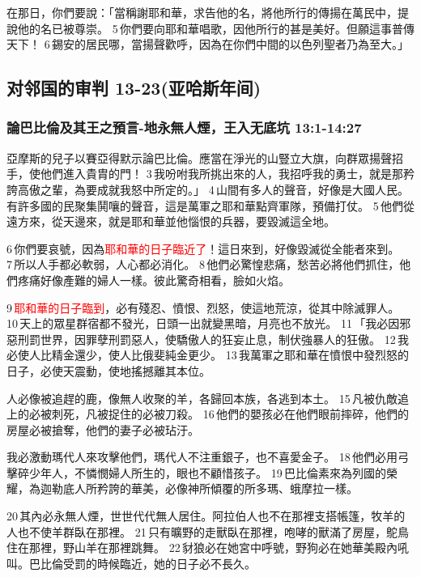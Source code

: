 在那日，你們要說：「當稱謝耶和華，求告他的名，將他所行的傳揚在萬民中，提說他的名已被尊崇。 5 你們要向耶和華唱歌，因他所行的甚是美好。但願這事普傳天下！ 6 錫安的居民哪，當揚聲歡呼，因為在你們中間的以色列聖者乃為至大。」

\subsection{对邻国的审判 13-23(亚哈斯年间)}
\subsubsection{論巴比倫及其王之預言-地永無人煙，王入无底坑 13:1-14:27}
亞摩斯的兒子以賽亞得默示論巴比倫。應當在淨光的山豎立大旗，向群眾揚聲招手，使他們進入貴胄的門！ 3 我吩咐我所挑出來的人，我招呼我的勇士，就是那矜誇高傲之輩，為要成就我怒中所定的。」 4 山間有多人的聲音，好像是大國人民。有許多國的民聚集鬨嚷的聲音，這是萬軍之耶和華點齊軍隊，預備打仗。 5 他們從遠方來，從天邊來，就是耶和華並他惱恨的兵器，要毀滅這全地。



6 你們要哀號，因為\textcolor{red}{耶和華的日子臨近了}！這日來到，好像毀滅從全能者來到。 7 所以人手都必軟弱，人心都必消化。 8 他們必驚惶悲痛，愁苦必將他們抓住，他們疼痛好像產難的婦人一樣。彼此驚奇相看，臉如火焰。 

9 \textcolor{red}{耶和華的日子臨到}，必有殘忍、憤恨、烈怒，使這地荒涼，從其中除滅罪人。 10 天上的眾星群宿都不發光，日頭一出就變黑暗，月亮也不放光。 11 「我必因邪惡刑罰世界，因罪孽刑罰惡人，使驕傲人的狂妄止息，制伏強暴人的狂傲。 12 我必使人比精金還少，使人比俄斐純金更少。 13 我萬軍之耶和華在憤恨中發烈怒的日子，必使天震動，使地搖撼離其本位。



人必像被追趕的鹿，像無人收聚的羊，各歸回本族，各逃到本土。 15 凡被仇敵追上的必被刺死，凡被捉住的必被刀殺。 16 他們的嬰孩必在他們眼前摔碎，他們的房屋必被搶奪，他們的妻子必被玷汙。

我必激動瑪代人來攻擊他們，瑪代人不注重銀子，也不喜愛金子。 18 他們必用弓擊碎少年人，不憐憫婦人所生的，眼也不顧惜孩子。 19 巴比倫素來為列國的榮耀，為迦勒底人所矜誇的華美，必像神所傾覆的所多瑪、蛾摩拉一樣。 

20 其內必永無人煙，世世代代無人居住。阿拉伯人也不在那裡支搭帳篷，牧羊的人也不使羊群臥在那裡。 21 只有曠野的走獸臥在那裡，咆哮的獸滿了房屋，鴕鳥住在那裡，野山羊在那裡跳舞。 22 豺狼必在她宮中呼號，野狗必在她華美殿內吼叫。巴比倫受罰的時候臨近，她的日子必不長久。

